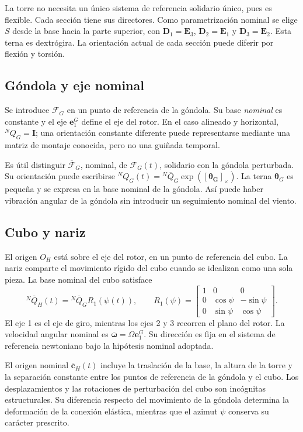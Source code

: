 \documentclass[11pt,a4paper,oneside]{report}
\newcommand{\vct}[1]{\bm{#1}}
\newcommand{\Id}{\mathbf I}
\newcommand{\sk}[1]{[\bm{#1}]_{\times}}
\begin{document}
La torre no necesita un único sistema de referencia solidario único, pues es flexible. Cada sección tiene sus directores. Como parametrización nominal se elige $S$ desde la base hacia la parte superior, con $\vct D_1=\vct E_3$, $\vct D_2=\vct E_1$ y $\vct D_3=\vct E_2$. Esta terna es dextrógira. La orientación actual de cada sección puede diferir por flexión y torsión.

\subsection{Góndola y eje nominal}
Se introduce $\mathcal F_G$ en un punto de referencia de la góndola. Su base \emph{nominal} es constante y el eje $\vct e_1^G$ define el eje del rotor. En el caso alineado y horizontal, ${}^NQ_G=\Id$; una orientación constante diferente puede representarse mediante una matriz de montaje conocida, pero no una guiñada temporal.

Es útil distinguir $\overline{\mathcal F}_G$, nominal, de $\mathcal F_G(t)$, solidario con la góndola perturbada. Su orientación puede escribirse ${}^NQ_G(t)={}^N\overline Q_G\exp(\sk{\theta_G})$. La terna $\vct\theta_G$ es pequeña y se expresa en la base nominal de la góndola. Así puede haber vibración angular de la góndola sin introducir un seguimiento nominal del viento.

\subsection{Cubo y nariz}
El origen $O_H$ está sobre el eje del rotor, en un punto de referencia del cubo. La nariz comparte el movimiento rígido del cubo cuando se idealizan como una sola pieza. La base nominal del cubo satisface
\begin{equation}
 {}^N\overline Q_H(t)={}^N\overline Q_G R_1(\psi(t)),\qquad
 R_1(\psi)=\begin{bmatrix}1&0&0\\0&\cos\psi&-\sin\psi\\0&\sin\psi&\cos\psi\end{bmatrix}.
\end{equation}
El eje 1 es el eje de giro, mientras los ejes 2 y 3 recorren el plano del rotor. La velocidad angular nominal es $\overline{\vct\omega}=\Omega\vct e_1^G$. Su dirección es fija en el sistema de referencia newtoniano bajo la hipótesis nominal adoptada.

El origen nominal $\overline{\vct c}_H(t)$ incluye la traslación de la base, la altura de la torre y la separación constante entre los puntos de referencia de la góndola y el cubo. Los desplazamientos y las rotaciones de perturbación del cubo son incógnitas estructurales. Su diferencia respecto del movimiento de la góndola determina la deformación de la conexión elástica, mientras que el azimut $\psi$ conserva su carácter prescrito.
\end{document}
